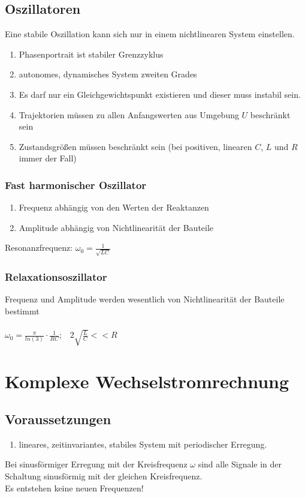 \documentclass[a4paper,twocolumn,10pt]{article}
\begin{document}
\subsection*{Oszillatoren}
Eine stabile Oszillation kann sich nur in einem nichtlinearen System einstellen.
\begin{enumerate}[label=-,leftmargin=3mm]
	\item Phasenportrait ist stabiler Grenzzyklus
	\item autonomes, dynamisches System zweiten Grades
	\item Es darf nur ein Gleichgewichtspunkt existieren und dieser muss instabil sein.
	\item Trajektorien müssen zu allen Anfangswerten aus Umgebung $U$ beschränkt sein
	\item Zustandsgrößen müssen beschränkt sein (bei positiven, linearen $C$, $L$ und $R$ immer der Fall)
\end{enumerate}
\subsubsection*{Fast harmonischer Oszillator}
\begin{enumerate}[label=-,leftmargin=3mm]
	\item Frequenz abhängig von den Werten der Reaktanzen
	\item Amplitude abhängig von Nichtlinearität der Bauteile
\end{enumerate}
Resonanzfrequenz: $\omega_0=\frac{1}{\sqrt{LC}}$
\subsubsection*{Relaxationsoszillator}
Frequenz und Amplitude werden wesentlich von Nichtlinearität der Bauteile bestimmt\\\\
$\omega_0=\frac{\pi}{ln(3)}\cdot \frac{1}{RC};\;\;\;2\sqrt{\frac{L}{C}}<<R$

\section*{Komplexe Wechselstromrechnung}
\subsection*{Voraussetzungen}
\begin{enumerate}[label=-,leftmargin=3mm]
	\item lineares, zeitinvariantes, stabiles System mit periodischer Erregung.
\end{enumerate}
Bei sinusförmiger Erregung mit der Kreisfrequenz $\omega$ sind alle Signale in der Schaltung sinusförmig mit der gleichen Kreisfrequenz.\\
Es entstehen keine neuen Frequenzen!
\end{document}
